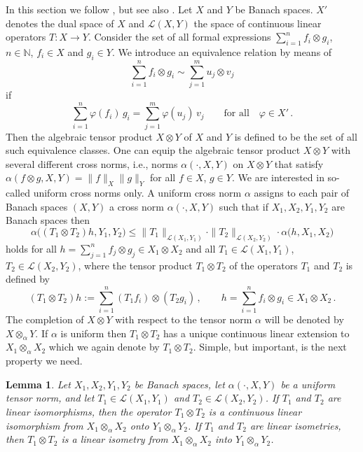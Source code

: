 \documentclass[12pt]{article}
\newtheorem{lemma}{Lemma}
\newcommand{\cl}{{\mathcal L}}
\newcommand{\N}{\mathbb{N}}
\newcommand{\be}{\begin{equation}}
\newcommand{\ee}{\end{equation}}
\begin{document}
In this section we follow \cite{LiCh}, but see also \cite{DF}.
Let $X$ and $Y$ be Banach spaces. $X'$ denotes the dual space of $X$
and $\cl (X,Y)$ the space of continuous linear operators $T: X \to Y$.
Consider the set of all formal expressions
$\sum_{i=1}^n f_i \otimes g_i$, $n \in \N$, $f_i \in X$ and $g_i \in Y$.
We introduce an equivalence relation by means of
\[
\sum_{i=1}^n f_i \otimes g_i \sim \sum_{j=1}^m u_j \otimes v_j
\]
if %
\be\label{eq-111}
\sum_{i=1}^n \varphi(f_i) \, g_i = \sum_{j=1}^m \varphi(u_j) \, v_j \qquad
\mbox{for all}\quad \varphi \in X'\, .
\ee
Then the algebraic tensor product $X \otimes Y$ of $X$ and $Y$
is defined to be the set of all such equivalence classes.
One can equip %
the algebraic tensor product $X \otimes Y$
with several different cross norms, i.e., norms 
$\alpha(\cdot, X,Y)$ on $X\otimes Y$ that satisfy $\alpha(f\otimes g, X,Y) = \|f\|_X \|g\|_Y$ for all $f\in X$, $g\in Y$.
We are interested in so-called uniform cross norms only.
A uniform cross norm $\alpha$ assigns to each pair of Banach spaces $(X,Y)$ a cross norm $\alpha(\cdot, X,Y)$ such that if
$X_1,X_2,Y_1,Y_2$ are Banach spaces 
then
\[
\alpha\big((T_1\otimes T_2)h,Y_1,Y_2 \big) \leq \|T_1\|_{ \mathcal{L}(X_1,Y_1)}
\cdot
    \|T_2\|_{ \mathcal{L}(X_2,Y_2)}
    \cdot \alpha\big(h,X_1,X_2\big)
\]
holds for all $ h = \sum\limits_{j=1}^n f_j\otimes g_j \in X_1 \otimes X_2$
and all $T_1 \in \cl (X_1,Y_1)$, $T_2 \in \cl (X_2,Y_2)$,
where the tensor product $T_1\otimes T_2$ of the operators $T_1$ and $T_2$ is 
defined by
\be\label{eq-114}
(T_1 \otimes T_2) h := \sum_{i=1}^n (T_1 f_i)\otimes (T_2 g_i) \, , \qquad
h = \sum\limits_{i=1}^n f_i\otimes g_i \in X_1 \otimes X_2\, .
\ee
The completion of $X\otimes Y$ with respect to the tensor norm $\alpha$ will be denoted by
$X\otimes_{\alpha} Y$. If $\alpha$ is uniform then  $T_1\otimes T_2$ has a unique
continuous linear 
extension to $X_1\otimes_{\alpha} X_2$ which we again denote by $T_1 \otimes T_2$.
Simple, but important, is the next property we need.

\begin{lemma}\label{tops1}
Let $X_1,X_2, Y_1,Y_2$ be Banach spaces, let
 $\alpha(\cdot,X,Y)$ be a uniform tensor norm, and let $T_1 \in \cl (X_1,Y_1)$ and $T_2 \in \cl (X_2,Y_2)$.
If $T_1$ and $T_2$ are linear isomorphisms, then the operator $T_1 \otimes T_2$ is a continuous linear isomorphism from
$X_1 \otimes_{\alpha} X_2$ onto $Y_1 \otimes_{\alpha} Y_2$.
If $T_1$ and $T_2$ are linear isometries, then $T_1\otimes T_2$ is a linear isometry from
$X_1 \otimes_{\alpha} X_2$ into $Y_1 \otimes_{\alpha} Y_2$.
\end{lemma}
\end{document}

